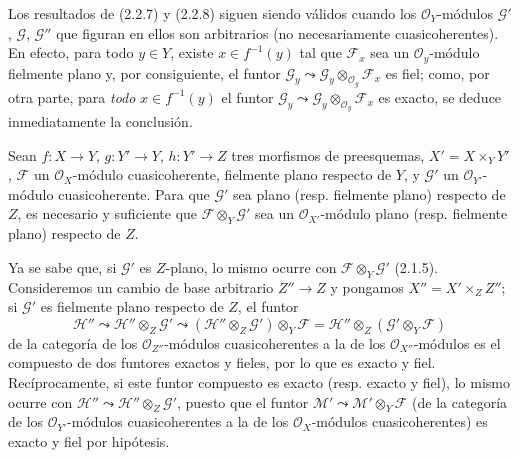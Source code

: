 \begin{remark}[2.2.9]
\label{IV.2.2.9-fr}
Los resultados de (2.2.7) y (2.2.8) siguen siendo válidos cuando los
$\mathcal O_Y$-módulos $\mathscr G'$, $\mathscr G$, $\mathscr G''$ que figuran
en ellos son arbitrarios (no necesariamente cuasicoherentes). En efecto,
para todo $y\in Y$, existe $x\in f^{-1}(y)$ tal que $\mathscr F_x$ sea un
$\mathcal O_y$-módulo
fielmente plano y, por consiguiente, el funtor
$\mathscr G_y\leadsto\mathscr G_y\otimes_{\mathcal O_y}\mathscr F_x$ es
fiel; como, por otra parte, para \emph{todo} $x\in f^{-1}(y)$ el funtor
$\mathscr G_y\leadsto\mathscr G_y\otimes_{\mathcal O_y}\mathscr F_x$ es
exacto, se deduce inmediatamente la conclusión.
\end{remark}

\begin{proposition}[2.2.10]
\label{IV.2.2.10-fr}
Sean $f:X\to Y$, $g:Y'\to Y$, $h:Y'\to Z$ tres morfismos de preesquemas,
$X'=X\times_Y Y'$, $\mathscr F$ un $\mathcal O_X$-módulo cuasicoherente,
fielmente plano respecto de $Y$, y $\mathscr G'$ un
$\mathcal O_{Y'}$-módulo cuasicoherente. Para que $\mathscr G'$ sea plano
\textup{(resp.} fielmente plano) respecto de $Z$, es necesario y suficiente que
$\mathscr F\otimes_Y\mathscr G'$ sea un $\mathcal O_{X'}$-módulo plano
\textup{(resp.} fielmente plano) respecto de $Z$.
\end{proposition}

Ya se sabe que, si $\mathscr G'$ es $Z$-plano, lo mismo ocurre con
$\mathscr F\otimes_Y\mathscr G'$ (2.1.5). Consideremos un cambio de base
arbitrario $Z''\to Z$ y pongamos $X''=X'\times_Z Z''$; si $\mathscr G'$ es
fielmente plano respecto de $Z$, el funtor
\begin{equation}
\tag{2.2.10.1}
\label{IV.2.2.10.1-fr}
\mathscr H''\leadsto\mathscr H''\otimes_Z\mathscr G'
\leadsto(\mathscr H''\otimes_Z\mathscr G')\otimes_Y\mathscr F
=\mathscr H''\otimes_Z(\mathscr G'\otimes_Y\mathscr F)
\end{equation}
de la categoría de los $\mathcal O_{Z''}$-módulos cuasicoherentes a la de
los $\mathcal O_{X''}$-módulos es el compuesto de dos funtores exactos y
fieles, por lo que es exacto y fiel. Recíprocamente, si este funtor compuesto
es exacto (resp. exacto y fiel), lo mismo ocurre con
$\mathscr H''\leadsto\mathscr H''\otimes_Z\mathscr G'$, puesto que el funtor
$\mathscr M'\leadsto\mathscr M'\otimes_Y\mathscr F$ (de la categoría de los
$\mathcal O_{Y'}$-módulos cuasicoherentes a la de los
$\mathcal O_X$-módulos cuasicoherentes) es exacto y fiel por hipótesis.

